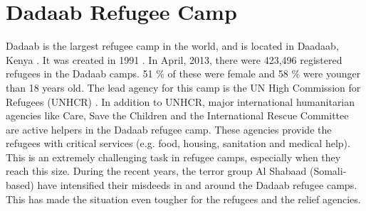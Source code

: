 \section{Dadaab Refugee Camp}
Dadaab is the largest refugee camp in the world, and is located in Daadaab, Kenya \cite{dadaab}. It was created in 1991 \cite{dadaabcare}. In April, 2013, there were 423,496 registered refugees in the Dadaab camps. 51 \% of these were female and 58 \% were younger than 18 years old. The lead agency for this camp is the UN High Commission for Refugees (UNHCR) \cite{dadaab}. In addition to UNHCR, major international humanitarian agencies like Care, Save the Children and the International Rescue Committee  are active helpers in the Dadaab refugee camp. These agencies provide the refugees with critical services (e.g. food, housing, sanitation and medical help). This is an extremely challenging task in refugee camps, especially when they reach this size. During the recent years, the terror group Al Shabaad (Somali-based) have intensified their misdeeds in and around the Dadaab refugee camps. This has made the situation even tougher for the refugees and the relief agencies. 

